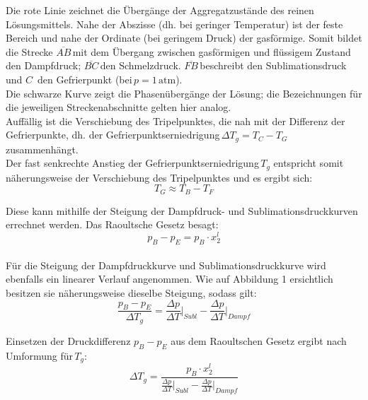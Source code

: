 \documentclass[12pt,a4paper,titlepage,headinclude,bibtotoc]{scrartcl}
\begin{document}
Die rote Linie zeichnet die Übergänge der Aggregatzustände des reinen Lösungsmittels. Nahe der Abszisse (dh. bei geringer Temperatur) ist der feste Bereich und nahe der Ordinate (bei geringem Druck) der gasförmige.
Somit bildet die Strecke $\overline{AB}$\,mit dem Übergang zwischen gasförmigen und flüssigem Zustand den Dampfdruck; $\overline{BC}$\,den Schmelzdruck. $\overline{FB}$\,beschreibt den Sublimationsdruck und $C$\, den Gefrierpunkt (bei\,$p= 1\,\mathrm{atm}$).\\
Die schwarze Kurve zeigt die Phasenübergänge der Lösung; die Bezeichnungen für die jeweiligen Streckenabschnitte gelten hier analog.\\
Auffällig ist die Verschiebung des Tripelpunktes, die nah mit der Differenz der Gefrierpunkte, dh. der Gefrierpunktserniedrigung\,$\Delta T_g = T_C - T_G$ zusammenhängt. \\
Der fast senkrechte Anstieg der Gefrierpunktserniedrigung\,$T_g$ entspricht somit näherungsweise der Verschiebung des Tripelpunktes und es ergibt sich:  \\

\begin{equation}
T_G \approx T_B - T_F
\end{equation}

\newpage

Diese kann mithilfe der Steigung der Dampfdruck- und Sublimationsdruckkurven errechnet werden. Das Raoultsche Gesetz besagt:\\

\begin{equation}
p_B - p_E = p_B \cdot x_2^l
\end{equation}
\\

Für die Steigung der Dampfdruckkurve und Sublimationsdruckkurve wird ebenfalls ein linearer Verlauf angenommen. Wie auf Abbildung 1 ersichtlich besitzen sie näherungsweise dieselbe Steigung, sodass gilt:\\

\begin{equation}
\dfrac{p_B - p_E}{\Delta T_g} = \frac{\Delta p}{\Delta T}\bigg \vert_{Subl} - \frac{\Delta p}{\Delta T}\bigg \vert_{Dampf}
\end{equation}

Einsetzen der Druckdifferenz $p_B - p_E$ aus dem Raoultschen Gesetz ergibt nach Umformung für\,$T_g$:\\

\begin{equation}
\Delta T_g =\dfrac{p_B \cdot x_2^l}{\frac{\Delta p}{\Delta T}\bigg \vert_{Subl} - \frac{\Delta p}{\Delta T}\bigg \vert_{Dampf}}
\end{equation}
\\
\end{document}

